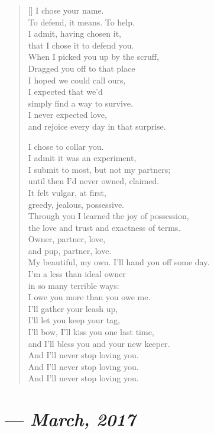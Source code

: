 \begin{verse}[\textwidth]
  I chose your name.\\
  To defend, it means. To help.\\
  I admit, having chosen it,\\
  that I chose it to defend you.\\
  When I picked you up by the scruff,\\
  Dragged you off to that place\\
  I hoped we could call ours,\\
  I expected that we'd\\
  simply find a way to survive.\\
  I never expected love,\\
  and rejoice every day in that surprise.

  I chose to collar you.\\
  I admit it was an experiment,\\
  I submit to most, but not my partners;\\
  until then I'd never owned, claimed.\\
  It felt vulgar, at first,\\
  greedy, jealous, possessive.\\
  Through you I learned the joy of possession,\\
  the love and trust and exactness of terms.\\
  Owner, partner, love,\\
  and pup, partner, love.\\
  My beautiful, my own.
  \newpage
  I'll hand you off some day.\\
  I'm a less than ideal owner\\
  in so many terrible ways:\\
  I owe you more than you owe me.\\
  I'll gather your leash up,\\
  I'll let you keep your tag,\\
  I'll bow, I'll kiss you one last time,\\
  and I'll bless you and your new keeper.\\
  And I'll never stop loving you.\\
  And I'll never stop loving you.\\
  And I'll never stop loving you.
\end{verse}
\newpage

\section{--- \textit{March, 2017}}


